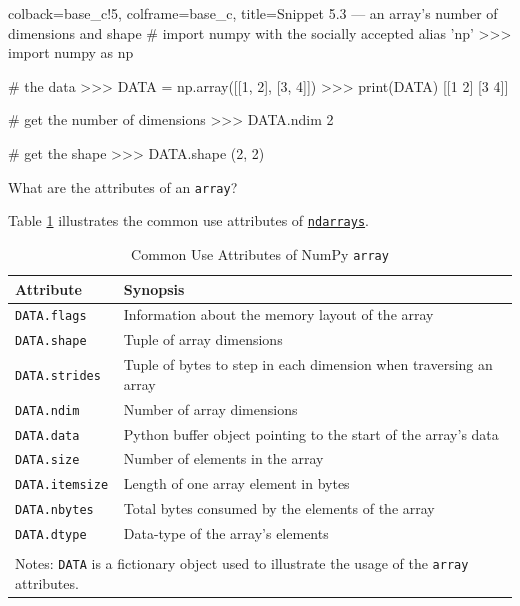 \documentclass[a4paper,11pt]{book}
\newcommand{\question}[1]{%
    \begin{tcolorbox}[colback=comp_c!10,colframe=comp_c,sidebyside align=top,width=\linewidth,before skip=1ex]
        #1
    \end{tcolorbox}
    \switchcolumn%
}
\newcommand{\note}[1]{%
    \begin{tcolorbox}[colback=white!0,colframe=white!10,width=\linewidth,before skip=1ex]
        #1
    \end{tcolorbox}
}
\begin{document}
\begin{pythoncode}[linenos=true,]{colback=base_c!5, colframe=base_c, title=\sffamily Snippet 5.3 --- an array's number of dimensions and shape}
# import numpy with the socially accepted alias 'np'
>>> import numpy as np

# the data
>>> DATA = np.array([[1, 2], [3, 4]])
>>> print(DATA)
[[1 2]
 [3 4]]

# get the number of dimensions
>>> DATA.ndim 
2

# get the shape
>>> DATA.shape
(2, 2)
\end{pythoncode}

\begin{paracol}{2}
	\question{\raggedright What are the attributes of an \texttt{array}?}
	\note{Table \ref{tab:array_attributes} illustrates the common use attributes of \href{https://numpy.org/doc/stable/reference/arrays.ndarray.html}{\texttt{ndarrays}}.}
\end{paracol}

\begin{table}[!htbp]
	\centering
	\caption{Common Use Attributes of NumPy \texttt{array}}
	\label{tab:array_attributes}
	\begin{tabular}{ll}
		\toprule \toprule
			Attribute & Synopsis \\
			\midrule 
                        \texttt{DATA.flags} &
                        Information about the memory layout of the array \\
                        \texttt{DATA.shape} &
                        Tuple of array dimensions\\
                        \texttt{DATA.strides}&
                        Tuple of bytes to step in each dimension when traversing an array\\
                        \texttt{DATA.ndim}&
                        Number of array dimensions\\
                        \texttt{DATA.data}&
                        Python buffer object pointing to the start of the array's data\\
                        \texttt{DATA.size}&
                        Number of elements in the array\\
                        \texttt{DATA.itemsize}&
                        Length of one array element in bytes\\
                        \texttt{DATA.nbytes}&
                        Total bytes consumed by the elements of the array\\
			\texttt{DATA.dtype}&
			Data-type of the array's elements\\
     			\bottomrule \\[-1.8ex]
			\multicolumn{2}{l}{Notes: \texttt{DATA} is a fictionary object used to illustrate the usage of the \texttt{array} attributes.} \\
	\end{tabular}
\end{table}
\clearpage 
\end{document}
